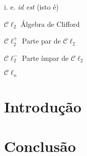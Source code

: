 \documentclass[12pt, oneside, a4paper, english, brazil]{abntex2}
\providecommand{\Cl}{\mathcal{C}\ell}
\providecommand{\Cldois}{\mathcal{C}\ell_2}
\providecommand{\Cldoispar}{\mathcal{C}\ell_2^{+}}
\providecommand{\Cldoisimpar}{\mathcal{C}\ell_2^{-}}
\theoremstyle{normal}
\theoremstyle{observacao}
\begin{document}
\begin{siglas}
\item[i. e.] \textit{id est} (isto é)
\end{siglas}

\begin{simbolos}
\item[$\Cldois$] Álgebra de Clifford
\item[$\Cldoispar$] Parte par de $\Cldois$
\item[$\Cldoisimpar$] Parte ímpar de $\Cldois$
\item[$\Cl_n$] 
\end{simbolos}

\tableofcontents*
\cleardoublepage


\textual
\pagestyle{simple}

\chapter{Introdução}

% 

\chapter{Conclusão}


\postextual





%
\end{document}
